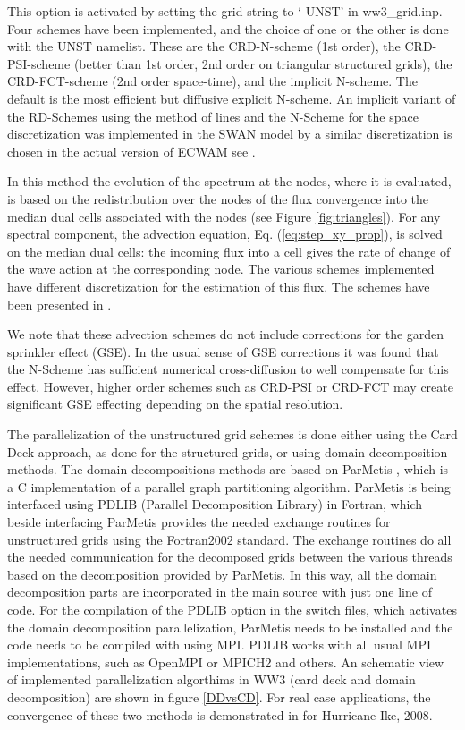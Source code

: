 This option is activated by setting the grid string to `{\code
UNST}' in {\file ww3\_grid.inp}.  Four schemes have been implemented, and the
choice of one or the other is done with the {\code UNST} namelist.  These are
the CRD-N-scheme (1st order), the CRD-PSI-scheme (better than 1st order, 2nd
order on triangular structured grids), the CRD-FCT-scheme (2nd order
space-time), and the implicit N-scheme. The default is the most efficient but
diffusive explicit N-scheme. An implicit variant of the RD-Schemes
using the method of lines and the N-Scheme for the space discretization was
implemented in the SWAN model by \cite{art:Zij10}  a similar discretization
is chosen in the actual version of ECWAM see \cite{pro:rol2012}.

In this method the evolution of the spectrum at the nodes, where it is
evaluated, is based on the redistribution over the nodes of the flux
convergence into the median dual cells associated with the nodes (see Figure
\ref{fig:triangles}).  For any spectral component, the advection equation, Eq.
(\ref{eq:step_xy_prop}), is solved on the median dual cells: the incoming flux
into a cell gives the rate of change of the wave action at the corresponding
node. The various schemes implemented have different discretization for the
estimation of this flux. The schemes have been presented in \citep[see][for a
review]{rep:Roland2008}.

We note that these advection schemes do not include corrections for
the garden sprinkler effect (GSE). In the usual sense of GSE corrections
it was found that the N-Scheme has sufficient numerical cross-diffusion
to well compensate for this effect. However, higher order schemes such
as CRD-PSI or CRD-FCT may create significant GSE effecting depending
on the spatial resolution.

The parallelization of the unstructured grid schemes is done either
using the Card Deck approach, as done for the structured grids, or using
domain decomposition methods. The domain decompositions methods are based
on ParMetis \citep{rep:karypis2011metis}, which is a C implementation of a parallel
graph partitioning algorithm. ParMetis is being interfaced using
PDLIB (Parallel Decomposition Library) in Fortran, which beside interfacing
ParMetis provides the needed exchange routines for unstructured
grids using the Fortran2002 standard. The exchange routines do
all the needed communication for the decomposed grids between the
various threads based on the decomposition provided by ParMetis.
In this way, all the domain decomposition parts are incorporated in
the main source with just one line of code. For the compilation of
the PDLIB option in the switch files, which activates the domain
decomposition parallelization, ParMetis needs to be installed
and the code needs to be compiled with using MPI. PDLIB works with
all usual MPI implementations, such as OpenMPI or MPICH2 and others. An schematic view of implemented parallelization algorthims in WW3 (card deck and domain decomposition) are shown in figure \ref{DDvsCD}. For real case applications, the convergence of these two methods is demonstrated in \cite{AbdolaliEtAl2019OM, jmse8050308} for Hurricane Ike, 2008.

